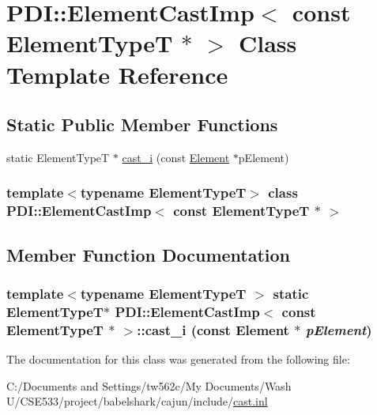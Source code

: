 \hypertarget{class_p_d_i_1_1_element_cast_imp_3_01const_01_element_type_t_01_5_01_4}{
\section{PDI::ElementCastImp$<$ const ElementTypeT $\ast$ $>$ Class Template Reference}
\label{class_p_d_i_1_1_element_cast_imp_3_01const_01_element_type_t_01_5_01_4}
}
\subsection*{Static Public Member Functions}
\begin{CompactItemize}
\item 
static ElementTypeT $\ast$ \hyperlink{class_p_d_i_1_1_element_cast_imp_3_01const_01_element_type_t_01_5_01_4_49f79c06fd74448f31256d19270d329f}{cast\_\-i} (const \hyperlink{class_p_d_i_1_1_element}{Element} $\ast$pElement)
\end{CompactItemize}
\subsubsection*{template$<$typename ElementTypeT$>$ class PDI::ElementCastImp$<$ const ElementTypeT $\ast$ $>$}



\subsection{Member Function Documentation}
\hypertarget{class_p_d_i_1_1_element_cast_imp_3_01const_01_element_type_t_01_5_01_4_49f79c06fd74448f31256d19270d329f}{
\subsubsection[{cast\_\-i}]{\setlength{\rightskip}{0pt plus 5cm}template$<$typename ElementTypeT $>$ static ElementTypeT$\ast$ PDI::ElementCastImp$<$ const ElementTypeT $\ast$ $>$::cast\_\-i (const {\bf Element} $\ast$ {\em pElement})}}
\label{class_p_d_i_1_1_element_cast_imp_3_01const_01_element_type_t_01_5_01_4_49f79c06fd74448f31256d19270d329f}




The documentation for this class was generated from the following file:\begin{CompactItemize}
\item 
C:/Documents and Settings/tw562c/My Documents/Wash U/CSE533/project/babelshark/cajun/include/\hyperlink{cast_8inl}{cast.inl}\end{CompactItemize}
